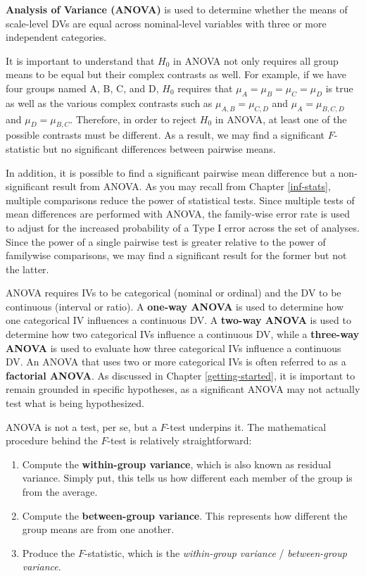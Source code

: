 \documentclass[]{book}
\providecommand{\tightlist}{%
  \setlength{\itemsep}{0pt}\setlength{\parskip}{0pt}}
\begin{document}
\textbf{Analysis of Variance (ANOVA)} is used to determine whether the means of scale-level DVs are equal across nominal-level variables with three or more independent categories.

It is important to understand that \(H_0\) in ANOVA not only requires all group means to be equal but their complex contrasts as well. For example, if we have four groups named A, B, C, and D, \(H_0\) requires that \(\mu_A = \mu_B = \mu_C = \mu_D\) is true as well as the various complex contrasts such as \(\mu_{A,B} = \mu_{C,D}\) and \(\mu_A = \mu_{B,C,D}\) and \(\mu_D = \mu_{B,C}\). Therefore, in order to reject \(H_0\) in ANOVA, at least one of the possible contrasts must be different. As a result, we may find a significant \(F\)-statistic but no significant differences between pairwise means.

In addition, it is possible to find a significant pairwise mean difference but a non-significant result from ANOVA. As you may recall from Chapter \ref{inf-stats}, multiple comparisons reduce the power of statistical tests. Since multiple tests of mean differences are performed with ANOVA, the family-wise error rate is used to adjust for the increased probability of a Type I error across the set of analyses. Since the power of a single pairwise test is greater relative to the power of familywise comparisons, we may find a significant result for the former but not the latter.

ANOVA requires IVs to be categorical (nominal or ordinal) and the DV to be continuous (interval or ratio). A \textbf{one-way ANOVA} is used to determine how one categorical IV influences a continuous DV. A \textbf{two-way ANOVA} is used to determine how two categorical IVs influence a continuous DV, while a \textbf{three-way ANOVA} is used to evaluate how three categorical IVs influence a continuous DV. An ANOVA that uses two or more categorical IVs is often referred to as a \textbf{factorial ANOVA}. As discussed in Chapter \ref{getting-started}, it is important to remain grounded in specific hypotheses, as a significant ANOVA may not actually test what is being hypothesized.

ANOVA is not a test, per se, but a \(F\)-test underpins it. The mathematical procedure behind the \(F\)-test is relatively straightforward:

\begin{enumerate}
\def\labelenumi{\arabic{enumi}.}
\tightlist
\item
  Compute the \textbf{within-group variance}, which is also known as residual variance. Simply put, this tells us how different each member of the group is from the average.
\item
  Compute the \textbf{between-group variance}. This represents how different the group means are from one another.
\item
  Produce the \(F\)-statistic, which is the \emph{within-group variance} / \emph{between-group variance}.
\end{enumerate}
\end{document}
